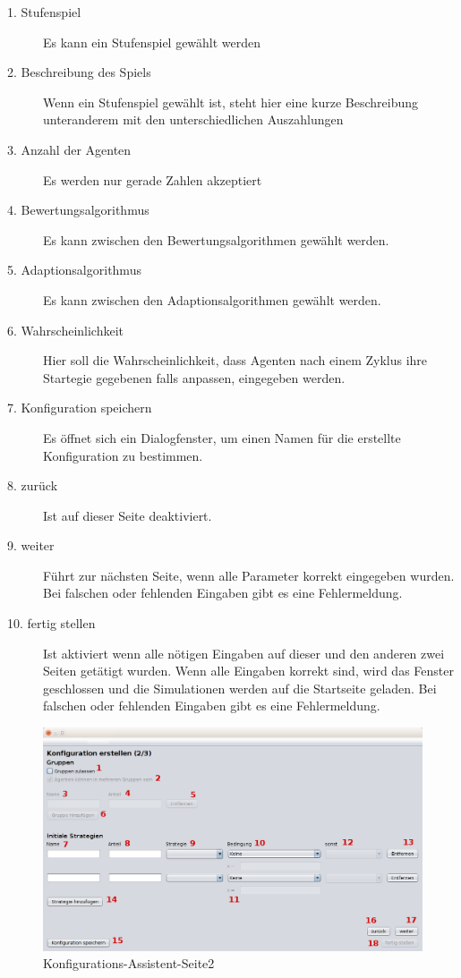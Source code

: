 \begin{description}

\item[1. Stufenspiel] Es kann ein Stufenspiel gewählt werden

\item[2. Beschreibung des Spiels] Wenn ein Stufenspiel gewählt ist, steht hier eine kurze Beschreibung unteranderem mit den unterschiedlichen Auszahlungen

\item[3. Anzahl der Agenten] Es werden nur gerade Zahlen akzeptiert

\item[4. Bewertungsalgorithmus] Es kann zwischen den Bewertungsalgorithmen gewählt werden.

\item[5. Adaptionsalgorithmus] Es kann zwischen den Adaptionsalgorithmen gewählt werden.

\item[6. Wahrscheinlichkeit] Hier soll die Wahrscheinlichkeit, dass Agenten nach einem Zyklus ihre Startegie gegebenen falls anpassen, eingegeben werden.

\item[7. Konfiguration speichern] Es öffnet sich ein Dialogfenster, um einen Namen für die erstellte Konfiguration zu bestimmen.

\item[8. zurück] Ist auf dieser Seite deaktiviert.

\item[9. weiter] Führt zur nächsten Seite, wenn alle Parameter korrekt eingegeben wurden. Bei falschen oder fehlenden Eingaben gibt es eine Fehlermeldung.

\item[10. fertig stellen] Ist aktiviert wenn alle nötigen Eingaben auf dieser und den anderen zwei Seiten getätigt wurden. Wenn alle Eingaben korrekt sind, wird das Fenster geschlossen und die Simulationen werden auf die Startseite geladen. Bei falschen oder fehlenden Eingaben gibt es eine Fehlermeldung.

\end{description}

\pagebreak

\begin{figure}[hp] 
  \centering
     \includegraphics[width=1.1\textwidth]{GUI_Entwurf/WizardFenster2.png}
  \caption{Konfigurations-Assistent-Seite2}
  \label{fig:Bild3}
\end{figure}

